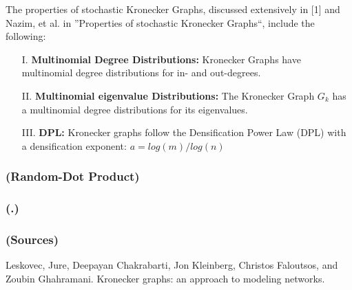 \documentclass{article}
\begin{document}
The properties of stochastic Kronecker Graphs, discussed extensively in [1] and Nazim, et al. in ''Properties of stochastic Kronecker Graphs``, include the following:

\begin{itemize}
    \item[I.] \textbf{Multinomial Degree Distributions: } Kronecker Graphs have multinomial degree distributions for in- and out-degrees.
    \item[II.] \textbf{Multinomial eigenvalue Distributions: } The Kronecker Graph $G_k$ has a multinomial degree distributions for its eigenvalues.
    \item[III.] \textbf{DPL: } Kronecker graphs follow the Densification Power Law (DPL) with a densification exponent: $a = log(m)/log(n)$
\end{itemize}





\subsubsection*{(Random-Dot Product)}

\subsubsection*{(.)}


\subsubsection*{(Sources)}

Leskovec, Jure, Deepayan Chakrabarti, Jon Kleinberg, Christos Faloutsos, and Zoubin Ghahramani. Kronecker graphs: an approach to modeling networks.


    
\end{document}
